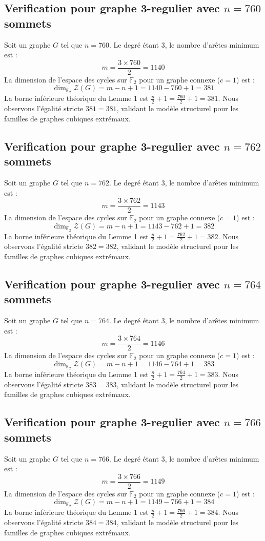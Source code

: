 \documentclass[11pt,a4paper]{article}
\begin{document}
\subsection{Verification pour graphe 3-regulier avec $n=760$ sommets}
Soit un graphe $G$ tel que $n = 760$. Le degré étant 3, le nombre d'arêtes minimum est :
$$ m = \frac{3 \times 760}{2} = 1140 $$
La dimension de l'espace des cycles sur $\mathbb{F}_2$ pour un graphe connexe ($c=1$) est :
$$ \dim_{\mathbb{F}_2} \mathcal{Z}(G) = m - n + 1 = 1140 - 760 + 1 = 381 $$
La borne inférieure théorique du Lemme 1 est $\frac{n}{2} + 1 = \frac{760}{2} + 1 = 381$.
Nous observons l'égalité stricte $381 = 381$, validant le modèle structurel pour les familles de graphes cubiques extrémaux.

\subsection{Verification pour graphe 3-regulier avec $n=762$ sommets}
Soit un graphe $G$ tel que $n = 762$. Le degré étant 3, le nombre d'arêtes minimum est :
$$ m = \frac{3 \times 762}{2} = 1143 $$
La dimension de l'espace des cycles sur $\mathbb{F}_2$ pour un graphe connexe ($c=1$) est :
$$ \dim_{\mathbb{F}_2} \mathcal{Z}(G) = m - n + 1 = 1143 - 762 + 1 = 382 $$
La borne inférieure théorique du Lemme 1 est $\frac{n}{2} + 1 = \frac{762}{2} + 1 = 382$.
Nous observons l'égalité stricte $382 = 382$, validant le modèle structurel pour les familles de graphes cubiques extrémaux.

\subsection{Verification pour graphe 3-regulier avec $n=764$ sommets}
Soit un graphe $G$ tel que $n = 764$. Le degré étant 3, le nombre d'arêtes minimum est :
$$ m = \frac{3 \times 764}{2} = 1146 $$
La dimension de l'espace des cycles sur $\mathbb{F}_2$ pour un graphe connexe ($c=1$) est :
$$ \dim_{\mathbb{F}_2} \mathcal{Z}(G) = m - n + 1 = 1146 - 764 + 1 = 383 $$
La borne inférieure théorique du Lemme 1 est $\frac{n}{2} + 1 = \frac{764}{2} + 1 = 383$.
Nous observons l'égalité stricte $383 = 383$, validant le modèle structurel pour les familles de graphes cubiques extrémaux.

\subsection{Verification pour graphe 3-regulier avec $n=766$ sommets}
Soit un graphe $G$ tel que $n = 766$. Le degré étant 3, le nombre d'arêtes minimum est :
$$ m = \frac{3 \times 766}{2} = 1149 $$
La dimension de l'espace des cycles sur $\mathbb{F}_2$ pour un graphe connexe ($c=1$) est :
$$ \dim_{\mathbb{F}_2} \mathcal{Z}(G) = m - n + 1 = 1149 - 766 + 1 = 384 $$
La borne inférieure théorique du Lemme 1 est $\frac{n}{2} + 1 = \frac{766}{2} + 1 = 384$.
Nous observons l'égalité stricte $384 = 384$, validant le modèle structurel pour les familles de graphes cubiques extrémaux.
\end{document}
